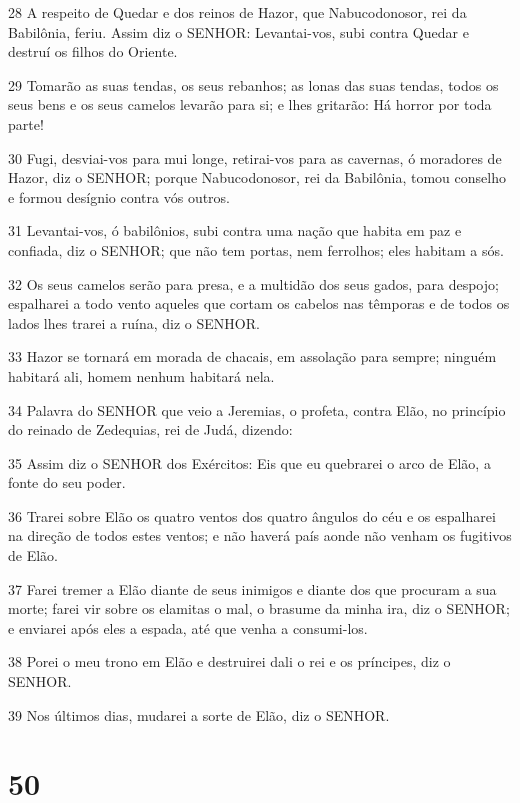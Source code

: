 \par 28 A respeito de Quedar e dos reinos de Hazor, que Nabucodonosor, rei da Babilônia, feriu. Assim diz o SENHOR: Levantai-vos, subi contra Quedar e destruí os filhos do Oriente.
\par 29 Tomarão as suas tendas, os seus rebanhos; as lonas das suas tendas, todos os seus bens e os seus camelos levarão para si; e lhes gritarão: Há horror por toda parte!
\par 30 Fugi, desviai-vos para mui longe, retirai-vos para as cavernas, ó moradores de Hazor, diz o SENHOR; porque Nabucodonosor, rei da Babilônia, tomou conselho e formou desígnio contra vós outros.
\par 31 Levantai-vos, ó babilônios, subi contra uma nação que habita em paz e confiada, diz o SENHOR; que não tem portas, nem ferrolhos; eles habitam a sós.
\par 32 Os seus camelos serão para presa, e a multidão dos seus gados, para despojo; espalharei a todo vento aqueles que cortam os cabelos nas têmporas e de todos os lados lhes trarei a ruína, diz o SENHOR.
\par 33 Hazor se tornará em morada de chacais, em assolação para sempre; ninguém habitará ali, homem nenhum habitará nela.
\par 34 Palavra do SENHOR que veio a Jeremias, o profeta, contra Elão, no princípio do reinado de Zedequias, rei de Judá, dizendo:
\par 35 Assim diz o SENHOR dos Exércitos: Eis que eu quebrarei o arco de Elão, a fonte do seu poder.
\par 36 Trarei sobre Elão os quatro ventos dos quatro ângulos do céu e os espalharei na direção de todos estes ventos; e não haverá país aonde não venham os fugitivos de Elão.
\par 37 Farei tremer a Elão diante de seus inimigos e diante dos que procuram a sua morte; farei vir sobre os elamitas o mal, o brasume da minha ira, diz o SENHOR; e enviarei após eles a espada, até que venha a consumi-los.
\par 38 Porei o meu trono em Elão e destruirei dali o rei e os príncipes, diz o SENHOR.
\par 39 Nos últimos dias, mudarei a sorte de Elão, diz o SENHOR.

\chapter{50}

